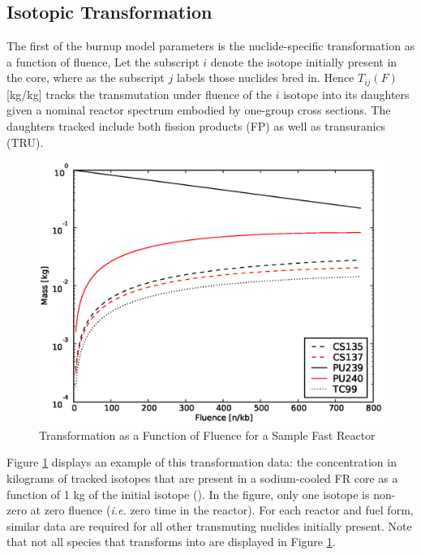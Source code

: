 \subsection{Isotopic Transformation}
\label{1g_sec:iso_transform}
The first of the burnup model parameters is the nuclide-specific transformation as a 
function of fluence, Let the subscript $i$ denote
the isotope initially present in the core, where as the subscript $j$ labels those nuclides bred in.  
Hence $T_{ij}(F)$ [kg/kg] tracks the transmutation under fluence 
of the $i$ isotope into its daughters 
given a nominal reactor spectrum embodied by one-group cross sections.  The daughters tracked 
include both fission products (FP) as well as transuranics (TRU).
\begin{figure}[htbp]
\caption{ Transformation as a Function of Fluence for a Sample Fast Reactor}
\label{1g_fig01}
\begin{center}
\includegraphics[scale=0.5]{one_group_method/figs/Fig01.eps}
\end{center}
\end{figure}
Figure \ref{1g_fig01} displays an example of this transformation data: the concentration in 
kilograms of tracked isotopes that are present in a sodium-cooled FR core as a function of 1 kg 
of the initial isotope ().  In the figure, only one isotope 
is non-zero at zero fluence (\emph{i.e.} zero time in the reactor).  For each 
reactor and fuel form, similar data are required for all other transmuting 
nuclides initially present.   Note that not all species that  transforms into are displayed
in Figure \ref{1g_fig01}. 

